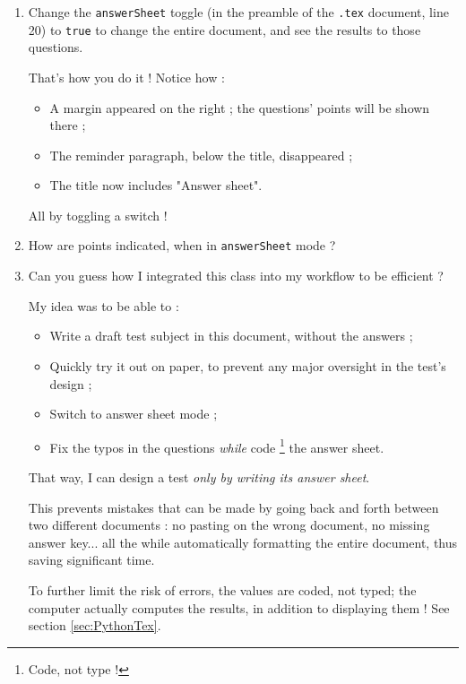 \documentclass[12pt,code]{HSP-Test}
\begin{document}
	\begin{enumerate}[label=\bfseries\arabic*.]
		\item Change the \texttt{answerSheet} toggle (in the preamble of the \texttt{.tex} document, line 20) to \texttt{true} to change the entire document, and see the results to those questions.
		\begin{answer}
			That's how you do it ! Notice how :
			\begin{itemize}
				\item A margin appeared on the right ; the questions' points will be shown there ;
				\item The reminder paragraph, below the title, disappeared ;
				\item The title now includes "Answer sheet".
			\end{itemize}
			
			All by toggling a switch !
		\end{answer}
	
		\item How are points indicated, when in \texttt{answerSheet} mode ?
	
		\item Can you guess how I integrated this class into my workflow to be efficient ?
		\begin{answer}
			My idea was to be able to :
			\begin{itemize}
				\item  Write a draft test subject in this document, without the answers ;
				\item  Quickly try it out on paper, to prevent any major oversight in the test's design ;
				\item  Switch to answer sheet mode ;
				\item  Fix the typos in the questions \emph{while} code \footnote{Code, not type !} the answer sheet.
			\end{itemize}
			
			That way, I can design a test \emph{only by writing its answer sheet}.
			
			This prevents mistakes that can be made by going back and forth between two different documents : no pasting on the wrong document, no missing answer key... all the while automatically formatting the entire document, thus saving significant time.
			
			To further limit the risk of errors, the values are coded, not typed; the computer actually computes the results, in addition to displaying them ! See section \ref{sec:PythonTex}.
		\end{answer}
	\end{enumerate}
	
\end{document}
